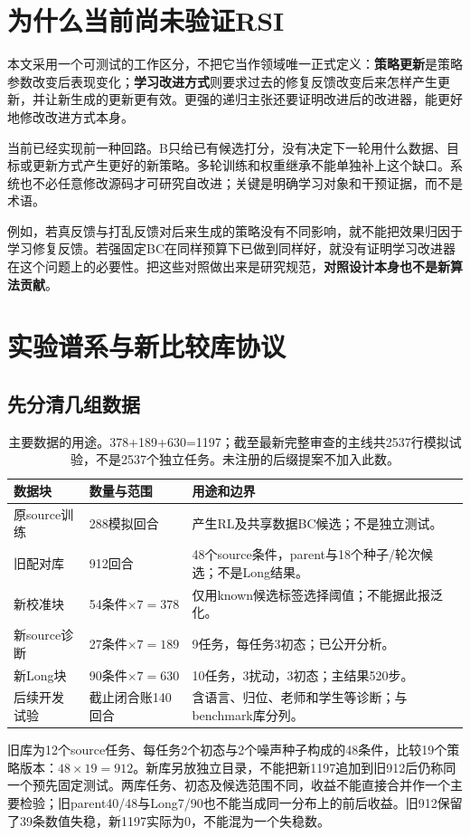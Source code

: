 \documentclass[UTF8,a4paper,fontset=none,zihao=-4]{ctexart}
\begin{document}
\section{为什么当前尚未验证RSI}
本文采用一个可测试的工作区分，不把它当作领域唯一正式定义：\textbf{策略更新}是策略参数改变后表现变化；\textbf{学习改进方式}则要求过去的修复反馈改变后来怎样产生更新，并让新生成的更新更有效。更强的递归主张还要证明改进后的改进器，能更好地修改改进方式本身。

当前已经实现前一种回路。B只给已有候选打分，没有决定下一轮用什么数据、目标或更新方式产生更好的新策略。多轮训练和权重继承不能单独补上这个缺口。系统也不必任意修改源码才可研究自改进；关键是明确学习对象和干预证据，而不是术语。

例如，若真反馈与打乱反馈对后来生成的策略没有不同影响，就不能把效果归因于学习修复反馈。若强固定BC在同样预算下已做到同样好，就没有证明学习改进器在这个问题上的必要性。把这些对照做出来是研究规范，\textbf{对照设计本身也不是新算法贡献}。

\section{实验谱系与新比较库协议}
\subsection{先分清几组数据}
\par
\begin{table}[htbp]\centering\small
\noindent\begin{tabularx}{\textwidth}{p{27mm}p{30mm}Y}
\toprule
数据块 & 数量与范围 & 用途和边界\\\midrule
原source训练 & 288模拟回合 & 产生RL及共享数据BC候选；不是独立测试。\\
旧配对库 & 912回合 & 48个source条件，parent与18个种子/轮次候选；不是Long结果。\\
新校准块 & 54条件$\times7=378$ & 仅用known候选标签选择阈值；不能据此报泛化。\\
新source诊断 & 27条件$\times7=189$ & 9任务，每任务3初态；已公开分析。\\
新Long块 & 90条件$\times7=630$ & 10任务，3扰动，3初态；主结果520步。\\
后续开发试验 & 截止闭合账140回合 & 含语言、归位、老师和学生等诊断；与benchmark库分列。\\
\bottomrule
\end{tabularx}
\caption{主要数据的用途。378+189+630=1197；截至最新完整审查的主线共2537行模拟试验，不是2537个独立任务。未注册的后缀提案不加入此数。}
\end{table}
\par
旧库为12个source任务、每任务2个初态与2个噪声种子构成的48条件，比较19个策略版本：$48\times19=912$。新库另放独立目录，不能把新1197追加到旧912后仍称同一个预先固定测试。两库任务、初态及候选范围不同，收益不能直接合并作一个主要检验；旧parent40/48与Long7/90也不能当成同一分布上的前后收益。旧912保留了39条数值失稳，新1197实际为0，不能混为一个失稳数。
\end{document}
